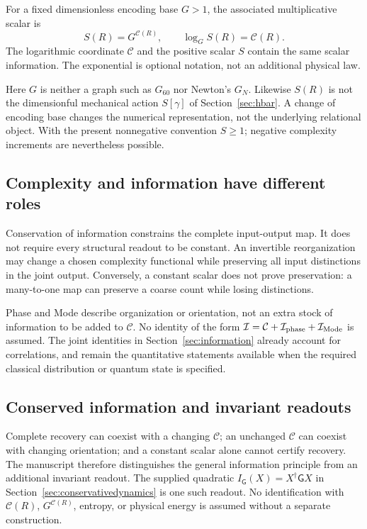 \begin{definition}
For a fixed dimensionless encoding base $G>1$, the associated multiplicative scalar is
\begin{equation}
S(R)=G^{\mathcal C(R)},\qquad \log_G S(R)=\mathcal C(R).
\tag{RC2}\label{eq:scalarencoding}
\end{equation}
The logarithmic coordinate $\mathcal C$ and the positive scalar $S$ contain the same scalar information. The exponential is optional notation, not an additional physical law.
\end{definition}
Here $G$ is neither a graph such as $G_{60}$ nor Newton's $G_N$. Likewise $S(R)$ is not the dimensionful mechanical action $S[\gamma]$ of Section~\ref{sec:hbar}. A change of encoding base changes the numerical representation, not the underlying relational object. With the present nonnegative convention $S\geq1$; negative complexity increments are nevertheless possible.

\subsection*{Complexity and information have different roles}
Conservation of information constrains the complete input-output map. It does not require every structural readout to be constant. An invertible reorganization may change a chosen complexity functional while preserving all input distinctions in the joint output. Conversely, a constant scalar does not prove preservation: a many-to-one map can preserve a coarse count while losing distinctions.

Phase and Mode describe organization or orientation, not an extra stock of information to be added to $\mathcal C$. No identity of the form $\mathcal I=\mathcal C+\mathcal I_{\rm phase}+\mathcal I_{\rm Mode}$ is assumed. The joint identities in Section~\ref{sec:information} already account for correlations, and remain the quantitative statements available when the required classical distribution or quantum state is specified.

\subsection*{Conserved information and invariant readouts}
Complete recovery can coexist with a changing $\mathcal C$; an unchanged $\mathcal C$ can coexist with changing orientation; and a constant scalar alone cannot certify recovery. The manuscript therefore distinguishes the general information principle from an additional invariant readout. The supplied quadratic $I_{\mathsf G}(X)=X^\dagger\mathsf G X$ in Section~\ref{sec:conservativedynamics} is one such readout. No identification with $\mathcal C(R)$, $G^{\mathcal C(R)}$, entropy, or physical energy is assumed without a separate construction.
\endgroup
\setcounter{section}{4}
